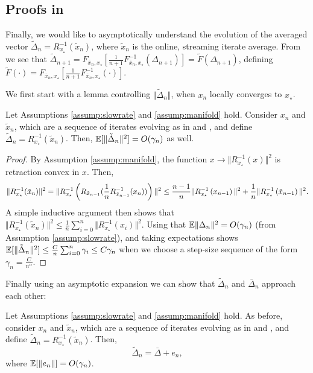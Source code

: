 \subsection{Proofs in }
Finally, we would like to asymptotically understand the evolution of the averaged vector $\tilde{\Delta}_n = R^{-1}_{x_\star}(\tilde{x}_n)$, where
$\tilde{x}_n$ is the online, streaming iterate average.
From  we see that $\tilde{\Delta}_{n+1} = F_{\bar{x}_n, x_\star}[\frac{1}{n+1} F^{-1}_{\bar{x}_n, x_\star}(\Delta_{n+1})] = \tilde{F}(\Delta_{n+1})$, defining
$\tilde{F}(\cdot) = F_{\bar x_n,x_\star}[\frac{1}{n+1} F_{\bar x_n,x_\star}^{-1}(\cdot)]$.

We first start with a lemma controlling $\Vert \tilde{\Delta}_n \Vert$, when $x_n$ locally converges to $x_\star$.
\begin{lemma} \label{lem:avg_iters}
  Let Assumptions  \ref{assump:slowrate} and \ref{assump:manifold}  hold. Consider $x_n$ and $\tilde{x}_n$, which are a sequence of iterates evolving as in   and , and define
  $\tilde {\Delta}_{n} = R_{x_\star}^{-1}(\tilde {x}_{n})$. Then,
  $\mathbb{E} [\Vert \tilde{\Delta}_n \Vert^2] = O(\gamma_n)$ as well.
\end{lemma}
\begin{proof}
  By Assumption \ref{assump:manifold}, the function $x \to \Vert R_{x_\star}^{-1}(x) \Vert^2$ is retraction convex in $x$.
  Then,
  \begin{align}
    \Vert R_{x_\star}^{-1}(\tilde{x}_n) \Vert^2 = \Vert R_{x_\star}^{-1} \left(R_{\tilde{x}_{n-1}}(\frac{1}{n} R^{-1}_{\tilde{x}_{n-1}}(x_n)) \right) \Vert^2 \leq \frac{n-1}{n} \Vert R_{x_\star}^{-1} \left(x_{n-1}\right) \Vert^2 + \frac{1}{n} \Vert R_{x_\star}^{-1} \left(\tilde{x}_{n-1}\right) \Vert^2. \notag
  \end{align}
  A simple inductive argument then shows that $\Vert R_{x_\star}^{-1}(\tilde{x}_n) \Vert^2 \leq \frac{1}{n} \sum_{i=0}^{n} \Vert R^{-1}_{x_\star}(x_i)\Vert^2$. Using that $\mathbb{E} \Vert \Delta_n \Vert^2 = O(\gamma_n)$ (from Assumption \ref{assump:slowrate}),
  and taking expectations shows $\mathbb{E}[\Vert \tilde{\Delta}_n \Vert^2] \leq \frac{C}{n} \sum_{i=0}^{n} \gamma_i \leq C \gamma_n$ when we choose a step-size sequence of the form $\gamma_n = \frac{C}{n^{\alpha}}$.
  \end{proof}
Finally using an asymptotic expansion we can show that $\tilde{\Delta}_n$ and $\bar{\Delta}_n$ approach each other:
\begin{lemma} \label{lem:stream_avg_iters}
  Let Assumptions \ref{assump:slowrate} and \ref{assump:manifold} hold. As before, consider $x_n$ and $\tilde{x}_n$, which are a sequence of iterates evolving as in   and , and define
  $\tilde {\Delta}_{n} = R_{x_\star}^{-1}(\tilde {x}_{n})$. Then,
  \[ \tilde{\Delta}_n=\bar{\Delta} + e_n, \]
where  $\mathbb{E} [\Vert e_n \Vert] = O(\gamma_n)$.
\end{lemma}
